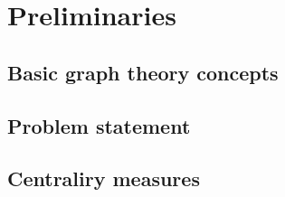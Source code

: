 \chapter{Preliminaries}


\section{Basic graph theory concepts}


\section{Problem statement}


\section{Centraliry measures}

